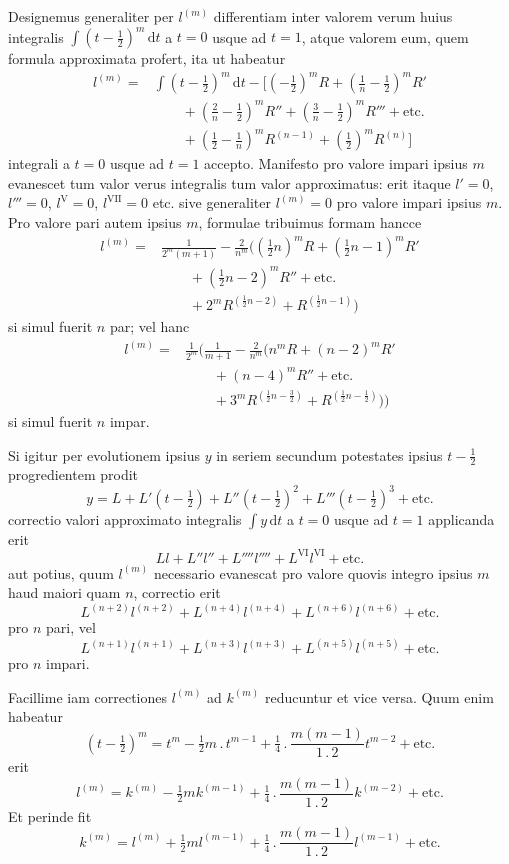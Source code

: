 Designemus generaliter per $l^{(m)}$ differentiam inter valorem verum huius
integralis $\int(t-\frac12)^m\,\mathrm{d}t$ a $t=0$ usque ad $t=1$, atque
valorem eum, quem formula approximata profert, ita ut habeatur
\[
\begin{aligned}
l^{(m)}={}&\int(t-\tfrac12)^m\,\mathrm{d}t
-\bigl[(-\tfrac12)^mR+(\tfrac1n-\tfrac12)^mR'
\\ &\qquad +(\tfrac2n-\tfrac12)^mR''+(\tfrac3n-\tfrac12)^mR'''+\text{etc.}\\
&\qquad +(\tfrac12-\tfrac1n)^mR^{(n-1)}+(\tfrac12)^mR^{(n)}\bigr]
\end{aligned}
\]
integrali a $t=0$ usque ad $t=1$ accepto. Manifesto pro valore impari ipsius
$m$ evanescet tum valor verus integralis tum valor approximatus: erit itaque
$l'=0$, $l'''=0$, $l^{\mathrm{V}}=0$, $l^{\mathrm{VII}}=0$ etc. sive generaliter
$l^{(m)}=0$ pro valore impari ipsius $m$. Pro valore pari autem ipsius $m$,
formulae tribuimus formam hancce
\[
\begin{aligned}
l^{(m)}={}&\frac1{2^m(m+1)}-\frac2{n^m}\bigl((\tfrac12n)^mR
+(\tfrac12n-1)^mR'\\ &\qquad +(\tfrac12n-2)^mR''+\text{etc.}\\
&\qquad +2^mR^{(\frac12n-2)}+R^{(\frac12n-1)}\bigr)
\end{aligned}
\]
si simul fuerit $n$ par; vel hanc
\[
\begin{aligned}
l^{(m)}={}&\frac1{2^m}\bigl(\frac1{m+1}-\frac2{n^m}\bigl(n^mR
+(n-2)^mR'\\ &\qquad +(n-4)^mR''+\text{etc.}\\
&\qquad +3^mR^{(\frac12n-\frac32)}+R^{(\frac12n-\frac12)}\bigr)\bigr)
\end{aligned}
\]
si simul fuerit $n$ impar.
\par{}
Si igitur per evolutionem ipsius $y$ in seriem secundum potestates ipsius
$t-\frac12$ progredientem prodit
\[
y=L+L'(t-\tfrac12)+L''(t-\tfrac12)^2+L'''(t-\tfrac12)^3+\text{etc.}
\]
correctio valori approximato integralis $\int y\,\mathrm{d}t$ a $t=0$ usque ad $t=1$ applicanda erit
\[
Ll+L''l''+L''''l''''+L^{\mathrm{VI}}l^{\mathrm{VI}}+\text{etc.}
\]
aut potius, quum $l^{(m)}$ necessario evanescat pro valore quovis integro ipsius $m$
haud maiori quam $n$, correctio erit
\[
L^{(n+2)}l^{(n+2)}+L^{(n+4)}l^{(n+4)}+L^{(n+6)}l^{(n+6)}+\text{etc.}
\]
pro $n$ pari, vel
\[
L^{(n+1)}l^{(n+1)}+L^{(n+3)}l^{(n+3)}+L^{(n+5)}l^{(n+5)}+\text{etc.}
\]
pro $n$ impari.

Facillime iam correctiones $l^{(m)}$ ad $k^{(m)}$ reducuntur et vice versa. Quum
enim habeatur
\[
(t-\tfrac12)^m=t^m-\tfrac12m\mathbin{.}t^{m-1}
+\tfrac14\mathbin{.}\frac{m(m-1)}{1\mathbin{.}2}t^{m-2}+\text{etc.}
\]
erit
\[
l^{(m)}=k^{(m)}-\tfrac12m k^{(m-1)}
+\tfrac14\mathbin{.}\frac{m(m-1)}{1\mathbin{.}2}k^{(m-2)}+\text{etc.}
\]
Et perinde fit
\[
k^{(m)}=l^{(m)}+\tfrac12m l^{(m-1)}
+\tfrac14\mathbin{.}\frac{m(m-1)}{1\mathbin{.}2}l^{(m-1)}+\text{etc.}
\]



